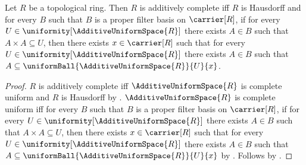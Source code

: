\begin{theorem}\label{additively_complete_iff_filter_basis_convergence}
    Let $R$ be a topological ring.
    Then $R$ is additively complete iff
        $R$ is Hausdorff and for every $B$ such that
            $B$ is a proper filter basis on $\carrier[R]$, if
            for every $U\in\uniformity[\AdditiveUniformSpace{R}]$ there
                exists $A\in B$ such that $A\times A\subseteq U$, then
            there exists $x\in\carrier[R]$ such that for every
                $U\in\uniformity[\AdditiveUniformSpace{R}]$ there exists
                $A\in B$ such that
                    $A\subseteq\uniformBall{\AdditiveUniformSpace{R}}{U}{x}$.
\end{theorem}
\begin{proof}
    $R$ is additively complete iff
        $\AdditiveUniformSpace{R}$ is complete uniform and
        $R$ is Hausdorff by .
    $\AdditiveUniformSpace{R}$ is complete uniform iff
        for every $B$ such that
            $B$ is a proper filter basis on $\carrier[R]$, if
            for every $U\in\uniformity[\AdditiveUniformSpace{R}]$ there
                exists $A\in B$ such that $A\times A\subseteq U$, then
            there exists $x\in\carrier[R]$ such that for every
                $U\in\uniformity[\AdditiveUniformSpace{R}]$ there exists
                $A\in B$ such that
                    $A\subseteq\uniformBall{\AdditiveUniformSpace{R}}{U}{x}$
        by .
    Follows by \auto.
\end{proof}
